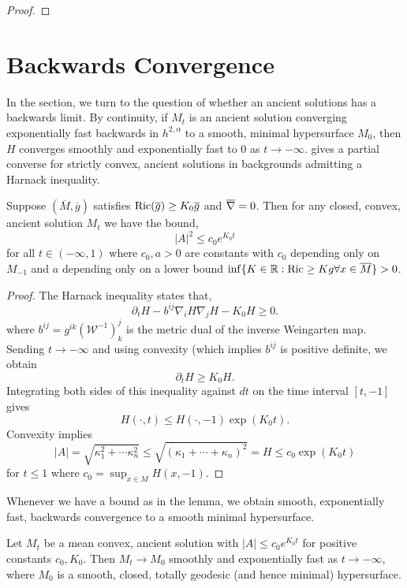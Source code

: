 \documentclass{amsart}
\begin{document}
\begin{proof}

\end{proof}

\section{Backwards Convergence}
\label{sec:backwards}

In the section, we turn to the question of whether an ancient solutions has a backwards limit. By continuity, if \(M_t\) is an ancient solution converging exponentially fast backwards in \(h^{2,\alpha}\) to a smooth, minimal hypersurface \(M_0\), then \(H\) converges smoothly and exponentially fast to \(0\) as \(t\to-\infty\).  gives a partial converse for strictly convex, ancient solutions in backgrounds admitting a Harnack inequality.

\begin{lemma}
\label{lem:bounded_sff}
Suppose \((\overline{M}, \overline{g})\) satisfies \(\operatorname{Ric}(\overline{g}) \geq K_0 \overline{g}\) and \(\overline{\nabla}\overline{\rm} = 0\). Then for any closed, convex, ancient solution \(M_t\) we have the bound,
\[
|A|^2 \leq c_0 e^{K_0t}
\]
for all \(t \in (-\infty, 1)\) where \(c_0, a > 0\) are constants with \(c_0\) depending only on \(M_{-1}\) and \(a\) depending only on a lower bound \(\inf \{K \in \mathbb{R} : \operatorname{Ric} \geq K g \forall x \in \overline{M}\} > 0\).
\end{lemma}

\begin{proof}
The Harnack inequality states that,
\[
\partial_t H - b^{ij}\nabla_iH\nabla_jH - K_0 H \geq 0.
\]
where \(b^{ij} = g^{ik} (\mathcal{W}^{-1})^j_k\) is the metric dual of the inverse Weingarten map. Sending \(t \to -\infty\) and using convexity (which implies \(b^{ij}\) is positive definite, we obtain
\[
\partial_t H \geq K_0 H.
\]
Integrating both sides of this inequality against $dt$ on the time interval $[t,-1]$ gives
\[
H(\cdot,t) \leq H(\cdot,-1) \exp(K_0t).
\]
Convexity implies
\[
|A| = \sqrt{\kappa_1^2 + \cdots \kappa_n^2} \leq \sqrt{(\kappa_1 + \cdots + \kappa_n)^2} = H \leq c_0\exp(K_0t)
\]
for $t\le 1$ where $c_0 = \sup_{x\in M} H(x, -1)$.
\end{proof}

Whenever we have a bound as in the lemma, we obtain smooth, exponentially fast, backwards convergence to a smooth minimal hypersurface.

\begin{thm}
\label{thm:backwards_convergence}
Let \(M_t\) be a mean convex, ancient solution with \(|A| \leq c_0 e^{K_0t}\) for positive constants \(c_0, K_0\). Then \(M_t \to M_0\) smoothly and exponentially fast as \(t \to -\infty\), where \(M_0\) is a smooth, closed, totally geodesic (and hence minimal) hypersurface.
\end{thm}
\end{document}
